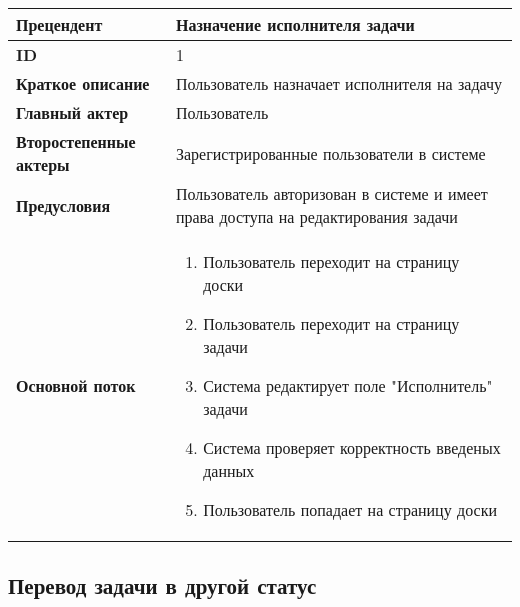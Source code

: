 \documentclass[14pt,a4paper]{extarticle}
\begin{document}
\begin{tabular}{|l|p{9cm}|}
	\hline
	\textbf{Прецендент}            & Назначение исполнителя задачи                                                     \\
	\hline
	\textbf{ID}                    & 1                                                                                 \\
	\hline
	\textbf{Краткое описание}      & Пользователь назначает исполнителя на задачу                                      \\
	\hline
	\textbf{Главный актер}         & Пользователь                                                                      \\
	\hline
	\textbf{Второстепенные актеры} & Зарегистрированные пользователи в системе                                         \\
	\hline
	\textbf{Предусловия}           & Пользователь авторизован в системе и имеет права доступа на редактирования задачи \\
	\hline
	\textbf{Основной поток}        & \begin{enumerate}
		                                 \item Пользователь переходит на страницу доски
		                                 \item Пользователь переходит на страницу задачи
		                                 \item Система редактирует поле "Исполнитель" задачи
		                                 \item Система проверяет корректность введеных данных
		                                 \item Пользователь попадает на страницу доски
	                                 \end{enumerate}                               \\
	\hline
\end{tabular}

\subsection{Перевод задачи в другой статус}
\end{document}
